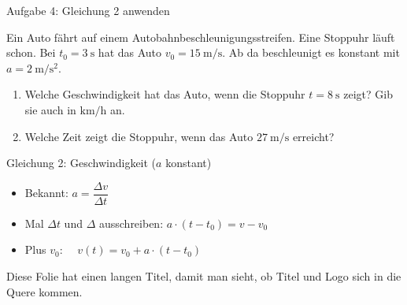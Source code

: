 \begin{frame}{Aufgabe 4: Gleichung 2 anwenden}
  \begin{aufgabebox}[Aufgabe 4]
    \small
    Ein Auto fährt auf einem Autobahnbeschleunigungsstreifen. Eine
    Stoppuhr läuft schon. Bei $t_0=\SI{3}{\second}$ hat das Auto
    $v_0=\SI{15}{\meter\per\second}$. Ab da beschleunigt es konstant mit
    $a=\SI{2}{\meter\per\second\squared}$.
    \begin{enumerate}
      \item[a)] Welche Geschwindigkeit hat das Auto, wenn die Stoppuhr
        $t=\SI{8}{\second}$ zeigt? Gib sie auch in
        $\si{\kilo\meter\per\hour}$ an.
      \item[b)] Welche Zeit zeigt die Stoppuhr, wenn das Auto
        $\SI{27}{\meter\per\second}$ erreicht?
    \end{enumerate}
  \end{aufgabebox}
\end{frame}

\begin{frame}{Gleichung 2: Geschwindigkeit ($a$ konstant)}
  \small
  \begin{itemize}
    \item Bekannt: $a=\dfrac{\Delta v}{\Delta t}$
    \item Mal $\Delta t$ und $\Delta$ ausschreiben:
      $a\cdot(t-t_0)=v-v_0$
    \item Plus $v_0$: $\quad v(t)=v_0+a\cdot(t-t_0)$
  \end{itemize}
  \vspace{0.5em}
  Diese Folie hat einen langen Titel, damit man sieht, ob Titel und Logo
  sich in die Quere kommen.
\end{frame}
